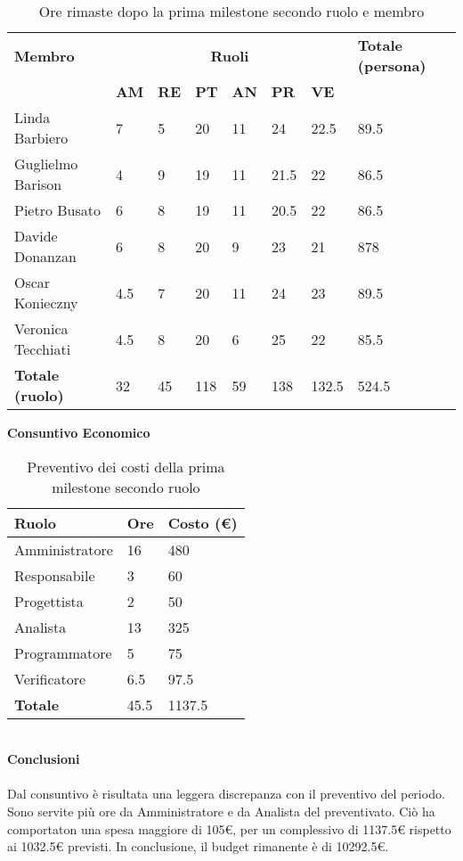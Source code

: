\begin{table}[ht!]
	\centering
	\begin{tabular}{p{4cm} p{1cm} p{1cm} p{1cm} p{1cm} p{1cm} p{1cm} p{3cm}}
		\toprule
        \textbf{Membro} & \multicolumn{6}{c}{\textbf{Ruoli}} & \textbf{Totale (persona)}\\
		& \textbf{AM} & \textbf{RE} & \textbf{PT} & \textbf{AN} & \textbf{PR} & \textbf{VE}\\
		\midrule
        Linda Barbiero          & 7     & 5     & 20     & 11   & 24     & 22.5   & 89.5 \\
        Guglielmo Barison       & 4     & 9     & 19     & 11   & 21.5   & 22     & 86.5\\
        Pietro Busato           & 6     & 8     & 19     & 11   & 20.5   & 22     & 86.5 \\
        Davide Donanzan         & 6     & 8     & 20     & 9    & 23     & 21     & 878 \\
        Oscar Konieczny         & 4.5   & 7     & 20     & 11   & 24     & 23     & 89.5 \\
        Veronica Tecchiati      & 4.5   & 8     & 20     & 6    & 25     & 22     & 85.5 \\
        \bottomrule
        \textbf{Totale (ruolo)} & 32    & 45    & 118    & 59   & 138     & 132.5 & 524.5 \\
	\end{tabular}
	\caption{Ore rimaste dopo la prima milestone secondo ruolo e membro}
	\label{table:Ore rimaste dopo la prima milestone secondo ruolo e membro}
\end{table}
\textbf{Consuntivo Economico}
\begin{table}[ht!]
	\centering
	\begin{tabular}{p{4cm} p{1cm} p{2cm}}
        \toprule
        \textbf{Ruolo} & \textbf{Ore} & \textbf{Costo (€)} \\
        \midrule
        Amministratore & 16 & 480 \\
        Responsabile & 3 & 60 \\
        Progettista & 2 & 50 \\
        Analista & 13 & 325 \\
        Programmatore & 5 & 75 \\
        Verificatore & 6.5 & 97.5 \\
        \bottomrule
        \textbf{Totale} & 45.5 & 1137.5
    \end{tabular}
    \caption{Preventivo dei costi della prima milestone secondo ruolo}
	\label{table:Preventivo dei costi consuntivi della prima milestone secondo ruolo}
\end{table}
\\
\textbf{Conclusioni}
\\\\
Dal consuntivo è risultata una leggera discrepanza con il preventivo del periodo. Sono servite più ore da Amministratore e da Analista del preventivato.
Ciò ha comportaton una spesa maggiore di 105€, per un complessivo di 1137.5€ rispetto ai 1032.5€ previsti.
In conclusione, il budget rimanente è di 10292.5€. 

